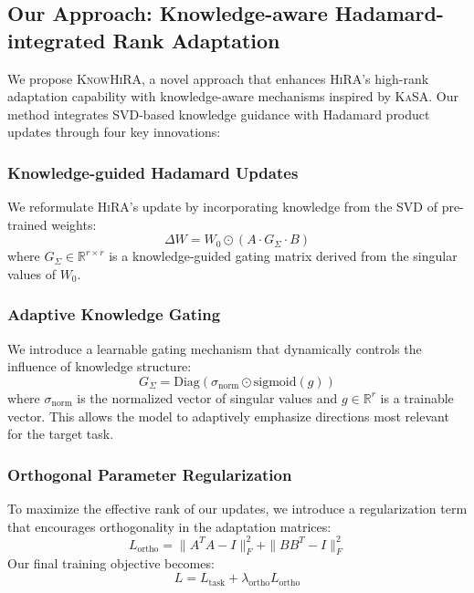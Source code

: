 \documentclass[10pt,letterpaper]{article}
\begin{document}
\subsection{Our Approach: Knowledge-aware Hadamard-integrated Rank Adaptation}

We propose \textsc{KnowHiRA}, a novel approach that enhances \textsc{HiRA}'s high-rank adaptation capability with knowledge-aware mechanisms inspired by \textsc{KaSA}. Our method integrates SVD-based knowledge guidance with Hadamard product updates through four key innovations:

\subsubsection{Knowledge-guided Hadamard Updates}

We reformulate \textsc{HiRA}'s update by incorporating knowledge from the SVD of pre-trained weights:
\begin{equation}
    \Delta W = W_0 \odot (A \cdot G_{\Sigma} \cdot B)
\end{equation}
where $G_{\Sigma} \in \mathbb{R}^{r \times r}$ is a knowledge-guided gating matrix derived from the singular values of $W_0$.

\subsubsection{Adaptive Knowledge Gating}

We introduce a learnable gating mechanism that dynamically controls the influence of knowledge structure:
\begin{equation}
    G_{\Sigma} = \text{Diag}(\sigma_{\text{norm}} \odot \text{sigmoid}(g))
\end{equation}
where $\sigma_{\text{norm}}$ is the normalized vector of singular values and $g \in \mathbb{R}^r$ is a trainable vector. This allows the model to adaptively emphasize directions most relevant for the target task.

\subsubsection{Orthogonal Parameter Regularization}

To maximize the effective rank of our updates, we introduce a regularization term that encourages orthogonality in the adaptation matrices:
\begin{equation}
    L_{\text{ortho}} = \|A^T A - I\|_F^2 + \|B B^T - I\|_F^2
\end{equation}
Our final training objective becomes:
\begin{equation}
    L = L_{\text{task}} + \lambda_{\text{ortho}} L_{\text{ortho}}
\end{equation}
\end{document}

